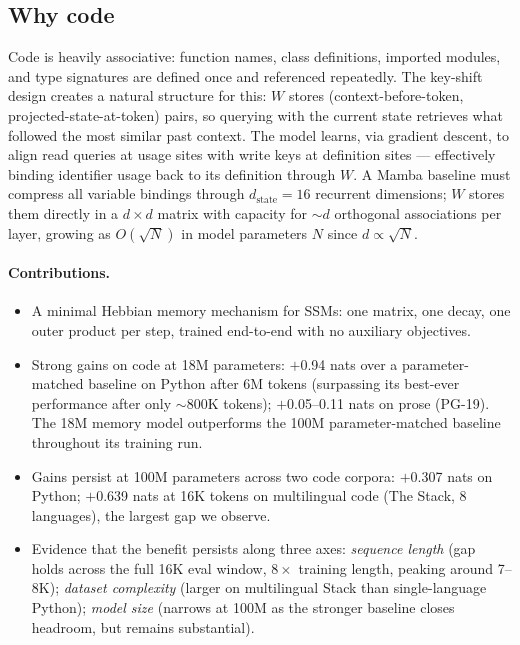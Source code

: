 \documentclass{article}
\begin{document}
\subsection*{Why code}
Code is heavily associative: function names, class definitions, imported modules, and type signatures are defined once and referenced repeatedly. The key-shift design creates a natural structure for this: $W$ stores (context-before-token, projected-state-at-token) pairs, so querying with the current state retrieves what followed the most similar past context. The model learns, via gradient descent, to align read queries at usage sites with write keys at definition sites --- effectively binding identifier usage back to its definition through $W$. A Mamba baseline must compress all variable bindings through $d_\text{state} = 16$ recurrent dimensions; $W$ stores them directly in a $d \times d$ matrix with capacity for ${\sim}d$ orthogonal associations per layer, growing as $O(\sqrt{N})$ in model parameters $N$ since $d \propto \sqrt{N}$.

\paragraph{Contributions.}
\begin{itemize}
    \item A minimal Hebbian memory mechanism for SSMs: one matrix, one decay, one outer product per step, trained end-to-end with no auxiliary objectives.
    \item Strong gains on code at 18M parameters: $+$0.94 nats over a parameter-matched baseline on Python after 6M tokens (surpassing its best-ever performance after only ${\sim}$800K tokens); $+$0.05--0.11 nats on prose (PG-19). The 18M memory model outperforms the 100M parameter-matched baseline throughout its training run.
    \item Gains persist at 100M parameters across two code corpora: $+$0.307 nats on Python; $+$0.639 nats at 16K tokens on multilingual code (The Stack, 8 languages), the largest gap we observe.
    \item Evidence that the benefit persists along three axes: \emph{sequence length} (gap holds across the full 16K eval window, $8\times$ training length, peaking around 7--8K); \emph{dataset complexity} (larger on multilingual Stack than single-language Python); \emph{model size} (narrows at 100M as the stronger baseline closes headroom, but remains substantial).
\end{itemize}
\end{document}
